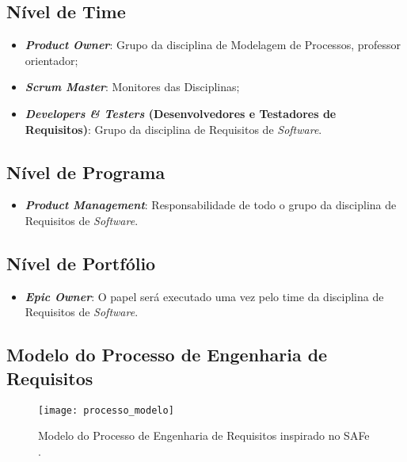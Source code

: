 		\subsection[Nível de Time]{Nível de Time}
		\label{subsec:processo_papeis_time}
			\begin{itemize}
				\item{\textbf{\emph{Product Owner}}: Grupo da disciplina de Modelagem de Processos, professor orientador;}
				\item{\textbf{\emph{Scrum Master}}: Monitores das Disciplinas;}
				\item{\textbf{\emph{Developers \& Testers} (Desenvolvedores e Testadores de Requisitos)}: Grupo da disciplina de Requisitos de \emph{Software}.}
			\end{itemize}

		\subsection[Nível de Programa]{Nível de Programa}
		\label{subsec:processo_papeis_programa}
			\begin{itemize}
				\item{\textbf{\emph{Product Management}}: Responsabilidade de todo o grupo da disciplina de Requisitos de \emph{Software}.}
			\end{itemize}

		\subsection[Nível de Portfólio]{Nível de Portfólio}
		\label{subsec:processo_papeis_programa}
			\begin{itemize}
				\item{\textbf{\emph{Epic Owner}}: O papel será executado uma vez pelo time da disciplina de Requisitos de \emph{Software}.}
			\end{itemize}

	\begin{landscape}
		\section[Modelo do Processo de Engenharia de Requisitos]{Modelo do Processo de Engenharia de Requisitos}
		\label{sec:processo_diagrama}
			\begin{figure}[h]
				\centering
				\texttt{[image: processo\_modelo]}
				\caption[Modelo do Processo de Engenharia de Requisitos]{Modelo do Processo de Engenharia de Requisitos inspirado no SAFe \cite{safe}.}
				\label{fig:modelo_processo}
			\end{figure}
	\end{landscape}

